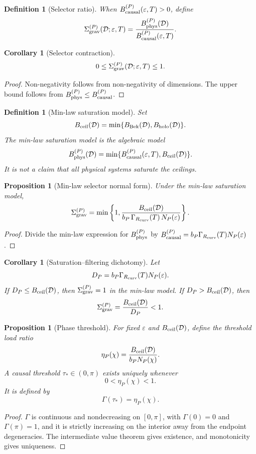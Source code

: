 \documentclass[11pt,a4paper]{article}
\newtheorem{proposition}[theorem]{Proposition}
\newtheorem{corollary}[theorem]{Corollary}
\newtheorem{definition}[theorem]{Definition}
\begin{document}
\begin{definition}[Selector ratio]
When $B_{\rm causal}^{(P)}(\varepsilon,T)>0$, define
\[
\Sigma_{\rm grav}^{(P)}(\mathcal D;\varepsilon,T)
=
\frac{B_{\rm phys}^{(P)}(\mathcal D)}
{B_{\rm causal}^{(P)}(\varepsilon,T)}.
\]
\end{definition}

\begin{corollary}[Selector contraction]
\[
0\le
\Sigma_{\rm grav}^{(P)}(\mathcal D;\varepsilon,T)
\le1.
\]
\end{corollary}
\begin{proof}
Non-negativity follows from non-negativity of dimensions.  The upper bound follows from
$B_{\rm phys}^{(P)}\le B_{\rm causal}^{(P)}$.
\end{proof}

\begin{definition}[Min-law saturation model]
Set
\[
B_{\rm ceil}(\mathcal D)=
\min\{B_{\rm Bek}(\mathcal D),B_{\rm holo}(\mathcal D)\}.
\]
The min-law saturation model is the algebraic model
\[
B_{\rm phys}^{(P)}(\mathcal D)
=
\min\{
B_{\rm causal}^{(P)}(\varepsilon,T),
B_{\rm ceil}(\mathcal D)
\}.
\]
It is not a claim that all physical systems saturate the ceilings.
\end{definition}

\begin{proposition}[Min-law selector normal form]
Under the min-law saturation model,
\[
\Sigma_{\rm grav}^{(P)}
=
\min\left\{
1,
\frac{B_{\rm ceil}(\mathcal D)}
{b_P\,\Gamma_{R_{\rm curv}}(T)\,N_P(\varepsilon)}
\right\}.
\]
\end{proposition}
\begin{proof}
Divide the min-law expression for $B_{\rm phys}^{(P)}$ by
$B_{\rm causal}^{(P)}=b_P\Gamma_{R_{\rm curv}}(T)N_P(\varepsilon)$.
\end{proof}


\begin{corollary}[Saturation--filtering dichotomy]
Let
\[
D_P=b_P\Gamma_{R_{\rm curv}}(T)N_P(\varepsilon).
\]
If $D_P\le B_{\rm ceil}(\mathcal D)$, then $\Sigma_{\rm grav}^{(P)}=1$ in the min-law model.  If $D_P>B_{\rm ceil}(\mathcal D)$, then
\[
\Sigma_{\rm grav}^{(P)}
=
\frac{B_{\rm ceil}(\mathcal D)}{D_P}<1.
\]
\end{corollary}

\begin{proposition}[Phase threshold]
\label{prop:phase-threshold}
For fixed $\varepsilon$ and $B_{\rm ceil}(\mathcal D)$, define the threshold load ratio
\[
\eta_P(\chi)=
\frac{B_{\rm ceil}(\mathcal D)}{b_PN_P(\chi)}.
\]
A causal threshold $\tau_*\in(0,\pi)$ exists uniquely whenever
\[
0<\eta_P(\chi)<1.
\]
It is defined by
\[
\Gamma(\tau_*)=\eta_P(\chi).
\]
\end{proposition}
\begin{proof}
$\Gamma$ is continuous and nondecreasing on $[0,\pi]$, with $\Gamma(0)=0$ and $\Gamma(\pi)=1$, and it is strictly increasing on the interior away from the endpoint degeneracies.  The intermediate value theorem gives existence, and monotonicity gives uniqueness.
\end{proof}
\end{document}
